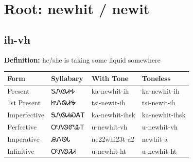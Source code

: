 \documentclass{article}%
\begin{document}
%
\normalsize%
\section*{Root: newhit / newit}%
\subsection*{ih-vh}%
\textbf{Definition: }%
he/she is taking some liquid somewhere%
\\[0.5em]%
\begin{tabular}{|l|l|l|l|}%
\hline%
\textbf{Form}&\textbf{Syllabary}&\textbf{With Tone}&\textbf{Toneless}\\%
\hline%
Present&ᎦᏁᏫᏗᎭ&ka{-}newhit{-}ih&ka{-}newhit{-}ih\\%
1st Present&ᏥᏁᏫᏗᎭ&tsi{-}newit{-}ih&tsi{-}newit{-}ih\\%
Imperfective&ᎦᏁᏫᏗᏍᎪᎢ&ka{-}newhit{-}ihsk&ka{-}newhit{-}ihsk\\%
Perfective&ᎤᏁᏫᏛᎲᎢ&u{-}newhit{-}vh&u{-}newhit{-}vh\\%
Imperative&ᎯᏁᏫᏓ&ne22whi23t{-}a2&newhit{-}a\\%
Infinitive&ᎤᏁᏫᏘᏗ&u{-}newhit{-}ht&u{-}newhit{-}ht\\%
\hline%
\end{tabular}%
\\[1em]%
\end{document}
